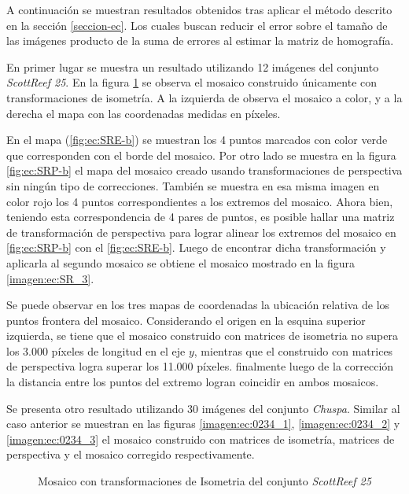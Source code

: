 A continuación se muestran resultados obtenidos tras aplicar el método descrito en la sección \ref{seccion-ec}. Los cuales buscan reducir el error sobre el tamaño de las imágenes producto de la suma de errores al estimar la matriz de homografía. 

En primer lugar se muestra un resultado utilizando 12 imágenes del conjunto \textit{ScottReef 25}. En la figura \ref{imagen:ec:SR_1} se observa el mosaico construido únicamente con transformaciones de isometría. A la izquierda de observa el mosaico a color, y a la derecha el mapa con las coordenadas medidas en píxeles.

En el mapa (\ref{fig:ec:SRE-b}) se muestran los 4 puntos marcados con color verde que corresponden con el borde del mosaico. Por otro lado se muestra en la figura \ref{fig:ec:SRP-b} el mapa del mosaico creado usando transformaciones de perspectiva sin ningún tipo de correcciones. También se muestra en esa misma imagen en color rojo los 4 puntos correspondientes a los extremos del mosaico. Ahora bien, teniendo esta correspondencia de 4 pares de puntos, es posible hallar una matriz de transformación de perspectiva para lograr alinear los extremos del mosaico en \ref{fig:ec:SRP-b} con el \ref{fig:ec:SRE-b}. Luego de encontrar dicha transformación y aplicarla al segundo mosaico se obtiene el mosaico mostrado en la figura  \ref{imagen:ec:SR_3}.

Se puede observar en los tres mapas de coordenadas la ubicación relativa de los puntos frontera del mosaico. Considerando el origen en la esquina superior izquierda, se tiene que el mosaico construido con matrices de isometria no supera los 3.000 píxeles de longitud en el eje $y$, mientras que el construido con matrices de perspectiva logra superar los 11.000 píxeles. finalmente luego de la corrección la distancia entre los puntos del extremo logran coincidir en ambos mosaicos.


Se presenta otro resultado utilizando 30 imágenes del conjunto \textit{Chuspa}. Similar al caso anterior se muestran en las figuras \ref{imagen:ec:0234_1}, \ref{imagen:ec:0234_2} y \ref{imagen:ec:0234_3} el mosaico construido con matrices de isometría, matrices de perspectiva y el mosaico corregido respectivamente.

\begin{figure}[H]
	\centering     %
	\hspace{1mm}%
	\hspace{1mm}%
	\caption[Mosaico con transformaciones de Isometria]{Mosaico con transformaciones de Isometria del conjunto \textit{ScottReef 25}}
	\label{imagen:ec:SR_1}
\end{figure}

